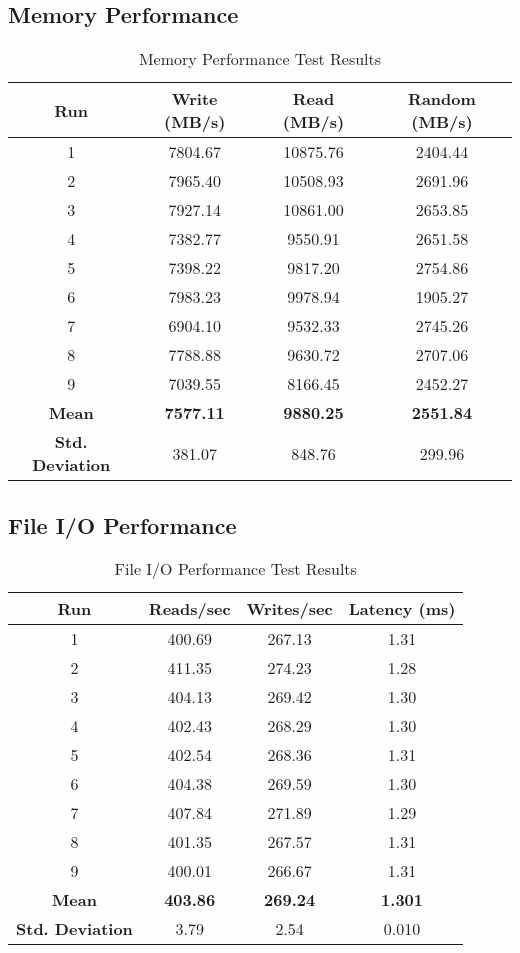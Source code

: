 \subsection{Memory Performance}
\begin{table}[H]
\centering
\begin{tabular}{|c|c|c|c|}
\hline
\textbf{Run} & \textbf{Write (MB/s)} & \textbf{Read (MB/s)} & \textbf{Random (MB/s)} \\
\hline
1 & 7804.67 & 10875.76 & 2404.44 \\
2 & 7965.40 & 10508.93 & 2691.96 \\
3 & 7927.14 & 10861.00 & 2653.85 \\
4 & 7382.77 & 9550.91 & 2651.58 \\
5 & 7398.22 & 9817.20 & 2754.86 \\
6 & 7983.23 & 9978.94 & 1905.27 \\
7 & 6904.10 & 9532.33 & 2745.26 \\
8 & 7788.88 & 9630.72 & 2707.06 \\
9 & 7039.55 & 8166.45 & 2452.27 \\
\hline
\textbf{Mean} & \textbf{7577.11} & \textbf{9880.25} & \textbf{2551.84} \\
\textbf{Std. Deviation} & 381.07 & 848.76 & 299.96 \\
\hline
\end{tabular}
\caption{Memory Performance Test Results}
\end{table}

\subsection{File I/O Performance}
\begin{table}[H]
\centering
\begin{tabular}{|c|c|c|c|}
\hline
\textbf{Run} & \textbf{Reads/sec} & \textbf{Writes/sec} & \textbf{Latency (ms)} \\
\hline
1 & 400.69 & 267.13 & 1.31 \\
2 & 411.35 & 274.23 & 1.28 \\
3 & 404.13 & 269.42 & 1.30 \\
4 & 402.43 & 268.29 & 1.30 \\
5 & 402.54 & 268.36 & 1.31 \\
6 & 404.38 & 269.59 & 1.30 \\
7 & 407.84 & 271.89 & 1.29 \\
8 & 401.35 & 267.57 & 1.31 \\
9 & 400.01 & 266.67 & 1.31 \\
\hline
\textbf{Mean} & \textbf{403.86} & \textbf{269.24} & \textbf{1.301} \\
\textbf{Std. Deviation} & 3.79 & 2.54 & 0.010 \\
\hline
\end{tabular}
\caption{File I/O Performance Test Results}
\end{table}

